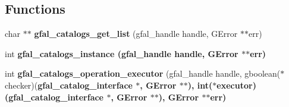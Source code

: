 \subsection*{Functions}
\begin{CompactItemize}
\item 
char $\ast$$\ast$ \textbf{gfal\_\-catalogs\_\-get\_\-list} (gfal\_\-handle handle, GError $\ast$$\ast$err)\label{gfal__common__catalog_8c_20c2d1d8a7a1ece12f74640325e0be89}

\item 
int \bf{gfal\_\-catalogs\_\-instance} (gfal\_\-handle handle, GError $\ast$$\ast$err)
\item 
int \textbf{gfal\_\-catalogs\_\-operation\_\-executor} (gfal\_\-handle handle, gboolean($\ast$checker)(\bf{gfal\_\-catalog\_\-interface} $\ast$, GError $\ast$$\ast$), int($\ast$executor)(\bf{gfal\_\-catalog\_\-interface} $\ast$, GError $\ast$$\ast$), GError $\ast$$\ast$err)\label{gfal__common__catalog_8c_50865ab5cba98b1c7e7f48d982120e3d}


\end{CompactItemize}
